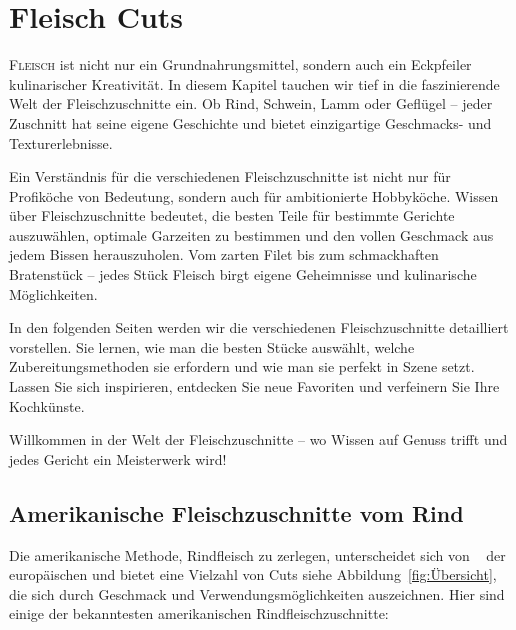 \chapter{Fleisch Cuts}\label{Chapter8}

\lettrine[lines=3]{F}{leisch} ist nicht nur ein Grundnahrungsmittel, sondern auch ein 
Eckpfeiler kulinarischer Kreativität. In diesem Kapitel tauchen wir tief in die 
faszinierende Welt der Fleischzuschnitte ein. Ob Rind, Schwein, Lamm oder 
Geflügel – jeder Zuschnitt hat seine eigene Geschichte und bietet einzigartige 
Geschmacks- und Texturerlebnisse.

Ein Verständnis für die verschiedenen Fleischzuschnitte ist nicht nur für 
Profiköche von Bedeutung, sondern auch für ambitionierte Hobbyköche. 
Wissen über Fleischzuschnitte bedeutet, die besten Teile für bestimmte 
Gerichte auszuwählen, optimale Garzeiten zu bestimmen und den vollen 
Geschmack aus jedem Bissen herauszuholen. Vom zarten Filet bis zum 
schmackhaften Bratenstück – jedes Stück Fleisch birgt eigene Geheimnisse 
und kulinarische Möglichkeiten.

In den folgenden Seiten werden wir die verschiedenen Fleischzuschnitte 
detailliert vorstellen. Sie lernen, wie man die besten Stücke auswählt, welche 
Zubereitungsmethoden sie erfordern und wie man sie perfekt in Szene setzt. 
Lassen Sie sich inspirieren, entdecken Sie neue Favoriten und verfeinern Sie 
Ihre Kochkünste.

Willkommen in der Welt der Fleischzuschnitte – wo Wissen auf Genuss trifft 
und jedes Gericht ein Meisterwerk wird!

\section{Amerikanische Fleischzuschnitte vom Rind}

Die amerikanische Methode, Rindfleisch zu zerlegen, unterscheidet sich von ~
der europäischen und bietet eine Vielzahl von Cuts siehe 
Abbildung~\vref{fig:Übersicht}, die sich durch Geschmack und 
Verwendungsmöglichkeiten auszeichnen. Hier sind einige der bekanntesten 
amerikanischen Rindfleischzuschnitte:

